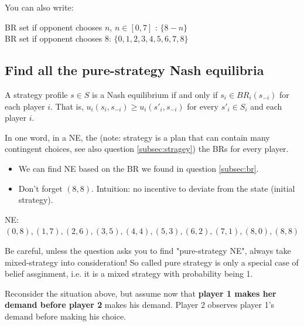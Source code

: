 \documentclass{article}
\begin{document}
\vspace{4mm}
You can also write: 
\vspace{4mm}

BR set if opponent chooses $n$, $n \in [0,7]$ : $\{8-n\}$ \\
BR set if opponent chooses $8$: $\{0,1,2,3,4,5,6,7,8\}$ \\



%
\subsection{Find all the pure-strategy Nash equilibria}

\begin{mdframed}[backgroundcolor=blue!20,linecolor=white]
A strategy profile $s \in S$ is a Nash equilibrium if and only if $s_i \in BR_i(s_{-i})$
for each player $i$. That is, $u_i (s_i , s_{−i}) \ge u_i (s'_i , s_{−i})$ for every  $s'_i \in S_i$
 and each player $i$.

\vspace{4mm}

In one word, in a NE, the (note: strategy is a plan that can contain many contingent choices, see also question \ref{subsec:stragey}) the BRs for every player. 

\begin{itemize}
\item We can find NE based on the BR we found in question \ref{subsec:br}. 
\item Don't forget $(8,8)$. Intuition: no incentive to deviate from the state (initial strategy).
\end{itemize}
\end{mdframed}

NE: $(0,8),(1,7),(2,6),(3,5),(4,4),(5,3),(6,2),(7,1),(8,0),(8,8)$
%


\begin{mdframed}[backgroundcolor=yellow!20,linecolor=white]
Be careful, unless the question asks you to find "pure-strategy NE", always take mixed-strategy into consideration! So called pure strategy is only a special case of belief assginment, i.e. it is a mixed strategy with probability being 1.
\end{mdframed}



\large{Reconsider the situation above, but assume now that \textbf{player 1 makes her demand before
player 2} makes his demand. Player 2 observes player 1's demand before making his choice.}
\end{document}
